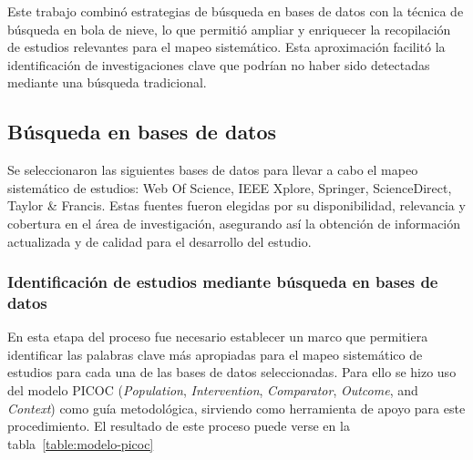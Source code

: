 Este trabajo combinó estrategias de búsqueda en bases de datos con la técnica de búsqueda en bola de nieve, lo que permitió ampliar y 
enriquecer la recopilación de estudios relevantes para el mapeo sistemático. Esta aproximación facilitó la identificación de 
investigaciones clave que podrían no haber sido detectadas mediante una búsqueda tradicional.

\subsection{Búsqueda en bases de datos}\label{subsec:busquedaBasesDatos}
Se seleccionaron las siguientes bases de datos para llevar a cabo el mapeo sistemático de estudios: Web Of Science, IEEE Xplore, 
Springer, ScienceDirect, Taylor \& Francis. Estas fuentes fueron elegidas por su disponibilidad, relevancia y cobertura en el área 
de investigación, asegurando así la obtención de información actualizada y de calidad para el desarrollo del estudio.


\newpage
\subsubsection{Identificación de estudios mediante búsqueda en bases de datos}\label{subsubsec:identificacionEstudios}
En esta etapa del proceso fue necesario establecer un marco que permitiera identificar las palabras clave más apropiadas para el mapeo 
sistemático de estudios para cada una de las bases de datos seleccionadas. Para ello se hizo uso del modelo PICOC (\textit{Population}, \textit{Intervention}, \textit{Comparator}, \textit{Outcome}, and \textit{Context}) como guía metodológica, sirviendo como herramienta de apoyo para este procedimiento. El resultado de este proceso puede verse en la tabla~\ref{table:modelo-picoc}

